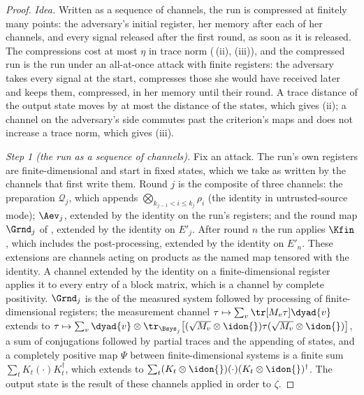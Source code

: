 \begin{proof}
\emph{Idea.} Written as a sequence of channels, the run is compressed at
finitely many points: the adversary's initial register, her memory after each
of her channels, and every signal released after the first round, as soon as
it is released. The compressions cost at most $\eta$ in trace norm
(\,(ii), (iii)), and the compressed
run is the run under an all-at-once attack with finite registers: the
adversary takes every signal at the start, compresses those she would have
received later and keeps them, compressed, in her memory until their round.
A trace distance of the output state moves by at most the distance of the
states, which gives (ii); a channel on the adversary's side commutes past the
criterion's maps and does not increase a trace norm, which gives (iii).

\emph{Step 1 (the run as a sequence of channels).} Fix an attack. The run's
own registers are finite-dimensional and start in fixed states, which we take
as written by the channels that first write them. Round $j$ is the composite
of three channels: the preparation $\mathcal{Q}_j$, which appends
$\bigotimes_{k_{j-1}<i\le k_j}\rho_i$ (the identity in untrusted-source mode);
$\Aev_j$, extended by the identity on the run's registers; and the round map
$\Grnd_j$ of , extended by the identity on
$E'_j$. After round $n$ the run applies $\Kfin$, which includes the
post-processing, extended by the identity on $E'_n$. These extensions are
channels acting on products as the named map tensored with the identity. A
channel extended by the identity on a finite-dimensional register applies it
to every entry of a block matrix, which is a channel by complete positivity.
$\Grnd_j$ is the  of the measured system followed
by processing of finite-dimensional registers; the measurement channel
$\tau\mapsto\sum_v\tr[M_v\tau]\dyad{v}$ extends to
$\tau\mapsto\sum_v\dyad{v}\otimes\tr_{\Bsys_j}\big[(\sqrt{M_v}\otimes\idon{})
\tau(\sqrt{M_v}\otimes\idon{})\big]$, a sum of conjugations followed by
partial traces and the appending of states, and a completely positive map
$\Psi$ between finite-dimensional systems is a finite sum
$\sum_tK_t(\cdot)K_t^{\dagger}$, which extends to
$\sum_t(K_t\otimes\idon{})(\cdot)(K_t\otimes\idon{})^{\dagger}$. The
output state is the result of these channels applied in order to $\zeta$.


\end{proof}
